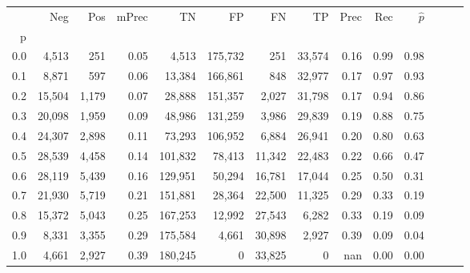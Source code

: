 \begin{tabular}{rrrrrrrrrrrrrr}
\toprule
{} &     Neg &    Pos & mPrec &       TN &       FP &      FN &      TP &  Prec &   Rec & $\hat{p}$ \\
p   &         &        &       &          &          &         &         &       &       &           \\
\midrule
0.0 &   4,513 &    251 &  0.05 &    4,513 &  175,732 &     251 &  33,574 &  0.16 &  0.99 &      0.98 \\
0.1 &   8,871 &    597 &  0.06 &   13,384 &  166,861 &     848 &  32,977 &  0.17 &  0.97 &      0.93 \\
0.2 &  15,504 &  1,179 &  0.07 &   28,888 &  151,357 &   2,027 &  31,798 &  0.17 &  0.94 &      0.86 \\
0.3 &  20,098 &  1,959 &  0.09 &   48,986 &  131,259 &   3,986 &  29,839 &  0.19 &  0.88 &      0.75 \\
0.4 &  24,307 &  2,898 &  0.11 &   73,293 &  106,952 &   6,884 &  26,941 &  0.20 &  0.80 &      0.63 \\
0.5 &  28,539 &  4,458 &  0.14 &  101,832 &   78,413 &  11,342 &  22,483 &  0.22 &  0.66 &      0.47 \\
0.6 &  28,119 &  5,439 &  0.16 &  129,951 &   50,294 &  16,781 &  17,044 &  0.25 &  0.50 &      0.31 \\
0.7 &  21,930 &  5,719 &  0.21 &  151,881 &   28,364 &  22,500 &  11,325 &  0.29 &  0.33 &      0.19 \\
0.8 &  15,372 &  5,043 &  0.25 &  167,253 &   12,992 &  27,543 &   6,282 &  0.33 &  0.19 &      0.09 \\
0.9 &   8,331 &  3,355 &  0.29 &  175,584 &    4,661 &  30,898 &   2,927 &  0.39 &  0.09 &      0.04 \\
1.0 &   4,661 &  2,927 &  0.39 &  180,245 &        0 &  33,825 &       0 &   nan &  0.00 &      0.00 \\
\bottomrule
\end{tabular}
